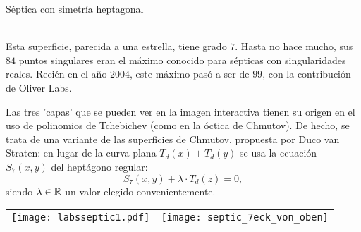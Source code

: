 \documentclass[es]{SurferDesc}%
\begin{document}
\footnotesize




\begin{surferPage}
  \begin{surferTitle}Séptica con simetría heptagonal\end{surferTitle}   \\
    Esta superficie, parecida a una estrella, tiene grado $7$. 
    Hasta no hace mucho, sus $84$ puntos singulares eran el máximo conocido para sépticas
    con singularidades reales. Recién en el año $2004$, este máximo pasó a ser de $99$, 
    con la contribución de Oliver Labs.
    
    Las tres 'capas' que se pueden ver en la imagen interactiva tienen su origen
    en el uso de polinomios de Tchebichev (como en la óctica de Chmutov).  
    De hecho, se trata de una variante de las superficies de Chmutov, propuesta por Duco van Straten:
    en lugar de la curva plana $T_d(x)+T_d(y)$ se usa la ecuación
    $S_7(x,y)$ del heptágono regular: 
    \[S_7(x,y) + \lambda \cdot T_d(z) = 0,\]
    siendo $\lambda\in{\mathbb R}$ un valor elegido convenientemente.

  
    \vspace*{-0.3em}
    \begin{center}
      \begin{tabular}{c@{\qquad}c}
        \texttt{[image: labsseptic1.pdf]}
        &
        \texttt{[image: septic\_7eck\_von\_oben]}
      \end{tabular}
    \end{center}
    \vspace*{-0.3em}   


  \begin{surferText}
     \end{surferText}
\end{surferPage}
\end{document}
